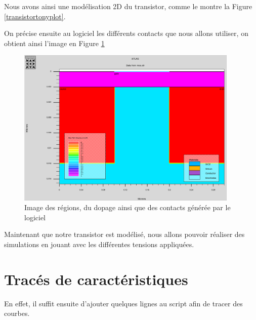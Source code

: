 \documentclass[a4paper,11pt]{report}
\begin{document}
Nous avons ainsi une modélisation 2D du transistor, comme le montre la Figure \ref{transistortonyplot}.

On précise ensuite au logiciel les différents contacts que nous allons utiliser, on obtient ainsi l'image en Figure \ref{TransistorFull}

\begin{figure}
    \centering
    \includegraphics[width=300pt]{TransistorFull.png}
    \caption{Image des régions, du dopage ainsi que des contacts générée par le logiciel}
    \label{TransistorFull}
\end{figure}

Maintenant que notre transistor est modélisé, nous allons pouvoir réaliser des simulations en jouant avec les différentes tensions appliquées.

\section{Tracés de caractéristiques}

En effet, il suffit ensuite d'ajouter quelques lignes au script afin de tracer des courbes.
\end{document}
